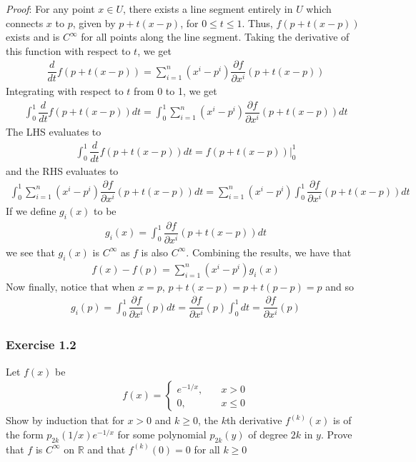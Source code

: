 \documentclass{article}
\newcommand{\R}{\mathbb{R}}
\begin{document}
	\noindent \textit{Proof}: For any point $x \in U$, there exists a line segment entirely in $U$ which connects $x$ to $p$, given by $p + t(x - p)$, for $0 \leq t \leq 1$. Thus, $f(p + t(x - p))$ exists and is $C^{\infty}$ for all points along the line segment. Taking the derivative of this function with respect to $t$, we get
	\begin{gather*}
		\dfrac{d}{dt} f(p + t(x - p)) = \sum_{i=1}^{n} (x^i - p^i) \dfrac{\partial f}{\partial x^i} (p + t(x - p))
	\end{gather*}
	Integrating with respect to $t$ from 0 to 1, we get
	\begin{gather*}
		\int_{0}^{1} \dfrac{d}{dt} f(p + t(x - p)) dt = \int_{0}^{1} \sum_{i=1}^{n} (x^i - p^i) \dfrac{\partial f}{\partial x^i} (p + t(x - p)) dt
	\end{gather*}
	The LHS evaluates to
	\begin{gather*}
		\int_{0}^{1} \dfrac{d}{dt} f(p + t(x - p)) dt = f(p + t(x - p)) \Big|_0^1
	\end{gather*}
	and the RHS evaluates to
	\begin{gather*}
		\int_{0}^{1} \sum_{i=1}^{n} (x^i - p^i) \dfrac{\partial f}{\partial x^i} (p + t(x - p)) dt = \sum_{i=1}^{n} (x^i - p^i) \int_{0}^{1} \dfrac{\partial f}{\partial x^i} (p + t(x - p)) dt
	\end{gather*}
	If we define $g_i(x)$ to be
	\begin{gather*}
		g_i(x) = \int_{0}^{1} \dfrac{\partial f}{\partial x^i} (p + t(x - p)) dt
	\end{gather*}
	we see that $g_i(x)$ is $C^{\infty}$ as $f$ is also $C^{\infty}$. Combining the results, we have that
	\begin{gather*}
		f(x) - f(p) = \sum_{i=1}^{n} (x^i - p^i) g_i(x)
	\end{gather*}
	Now finally, notice that when $x = p$, $p + t(x - p) = p + t(p - p) = p$ and so
	\begin{gather*}
		g_i(p) = \int_{0}^{1} \dfrac{\partial f}{\partial x^i} (p) dt = \dfrac{\partial f}{\partial x^i} (p) \int_{0}^{1} dt = \dfrac{\partial f}{\partial x^i} (p)
	\end{gather*}
	
	\subsubsection*{Exercise 1.2}
	Let $f(x)$ be
	\begin{gather*}
		f(x) = \begin{cases}
			e^{-1/x}, \quad &x > 0 \\
			0, \quad &x \leq 0
		\end{cases}
	\end{gather*}
	Show by induction that for $x > 0$ and $k \geq 0$, the $k$th derivative $f^{(k)}(x)$ is of the form $p_{2k}(1/x)e^{-1/x}$ for some polynomial $p_{2k}(y)$ of degree $2k$ in $y$. Prove that $f$ is $C^{\infty}$ on $\R$ and that $f^{(k)}(0) = 0$ for all $k \geq 0$
	
\end{document}
